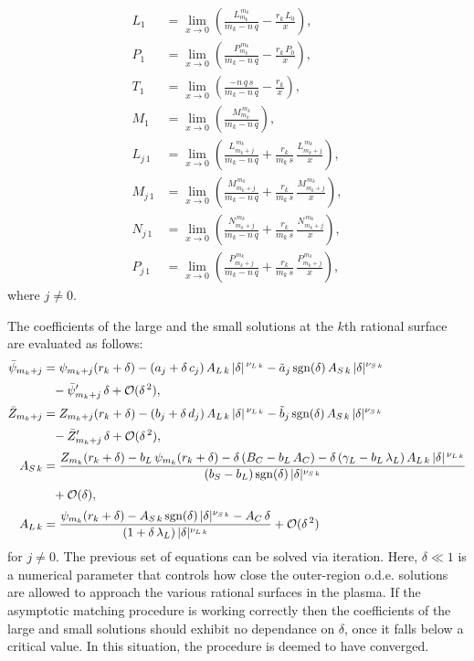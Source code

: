 \documentclass[12pt,prb,aps]{revtex4-1}
\begin{document}
\begin{align}
L_1&= \lim_{x\rightarrow 0}\left(\frac{L_{m_k}^{\,m_k}}{m_k-n\,q}-\frac{r_k\,L_0}{x}\right),\\[0.5ex]
P_1&=  \lim_{x\rightarrow 0}\left(\frac{P_{m_k}^{\,m_k}}{m_k-n\,q}-\frac{r_k\,P_0}{x}\right),\\[0.5ex]
T_1 &= \lim_{x\rightarrow 0}\left(\frac{-n\,q\,s}{m_k-n\,q}-\frac{r_k}{x}\right),\\[0.5ex]
M_1 &= \lim_{x\rightarrow 0}\left(\frac{M_{m_k}^{\,m_k}}{m_k-n\,q}\right),\\[0.5ex]
L_{j\,1}&=\lim_{x\rightarrow 0}\left(\frac{L_{m_k+j}^{\,m_k}}{m_k-n\,q}+\frac{r_k}{m_k\,s}\,\frac{L_{m_k+j}^{\,m_k}}{x}\right),\\[0.5ex]
M_{j\,1}&=\lim_{x\rightarrow 0}\left(\frac{M_{m_k+j}^{\,m_k}}{m_k-n\,q}+\frac{r_k}{m_k\,s}\,\frac{M_{m_k+j}^{\,m_k}}{x}\right),\\[0.5ex]
N_{j\,1}&=\lim_{x\rightarrow 0}\left(\frac{N_{m_k+j}^{\,m_k}}{m_k-n\,q}+\frac{r_k}{m_k\,s}\,\frac{N_{m_k+j}^{\,m_k}}{x}\right),\\[0.5ex]
P_{j\,1}&=\lim_{x\rightarrow 0}\left(\frac{P_{m_k+j}^{\,m_k}}{m_k-n\,q}+\frac{r_k}{m_k\,s}\,\frac{P_{m_k+j}^{\,m_k}}{x}\right),
\end{align}
where $j\neq 0$. 

The coefficients of the large and the small solutions at the $k$th rational surface are evaluated as follows:
\begin{align}
\bar{\psi}_{m_k+j} &= \psi_{m_k+j}(r_k+\delta)- (a_j+\delta\,c_j)\,A_{L\,k}\,|\delta|^{\,\nu_{L\,k}}-\tilde{a}_j\,{\rm sgn}(\delta)\,A_{S\,k}\,|\delta|^{\nu_{S\,k}}\nonumber\\[0.5ex]
&\phantom{=}-\bar{\psi}'_{m_k+j}\,\delta+{\cal O}(\delta^{\,2}),\\[0.5ex]
\bar{Z}_{m_k+j}&= Z_{m_k+j}(r_k+\delta)- (b_j+\delta\,d_j)\,A_{L\,k}\,|\delta|^{\,\nu_{L\,k}}-\tilde{b}_j\,{\rm sgn}(\delta)\,A_{S\,k}\,|\delta|^{\nu_{S\,k}}\nonumber\\[0.5ex]
&\phantom{=}-\bar{Z}'_{m_k+j}\,\delta+{\cal O}(\delta^{\,2}),\\[0.5ex]
A_{S\,k} &= \frac{Z_{m_k}(r_k+\delta)-b_L\,\psi_{m_k}(r_k+\delta)-\delta\,(B_C-b_L\,A_C)-\delta\,(\gamma_L-b_L\,\lambda_L)\,A_{L\,k}\,|\delta|^{\,\nu_{L\,k}}}{
(b_S-b_L)\,{\rm sgn}(\delta)\,|\delta|^{\nu_{S\,k}}}\nonumber\\[0.5ex]
&\phantom{=}+{\cal O}(\delta),\\[0.5ex]
A_{L\,k} &= \frac{\psi_{m_k}(r_k+\delta)-A_{S\,k}\,{\rm sgn}(\delta)\,|\delta|^{\nu_{S\,k}}-A_C\,\delta}{(1+\delta\,\lambda_L)\,|\delta|^{\nu_{L\,k}}}+{\cal O}(\delta^{\,2})
\end{align}
for $j\neq 0$. The previous set of equations can be solved via iteration. Here, $\delta\ll 1$ is a numerical parameter that controls how close the outer-region o.d.e.  solutions  are allowed to approach the various rational surfaces in the plasma. If the asymptotic matching procedure is working
correctly then the coefficients of the large and small solutions should exhibit no dependance on $\delta$, once it falls below a critical value. In this situation, the
procedure is deemed to have converged. 
\end{document}
